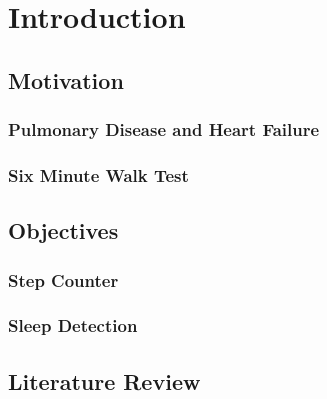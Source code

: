 \part{Introduction}

    \chapter{Motivation}

        \section{Pulmonary Disease and Heart Failure}

        \section{Six Minute Walk Test}

    \chapter{Objectives}

        \section{Step Counter}

        \section{Sleep Detection}

    \chapter{Literature Review}